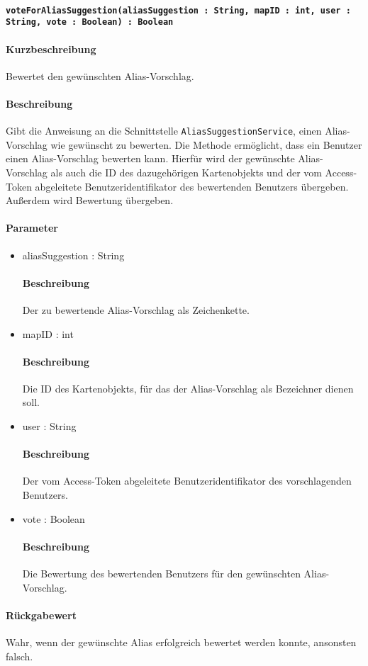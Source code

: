 \paragraph*{\texttt{voteForAliasSuggestion(aliasSuggestion : String, mapID : int, user : String, vote : Boolean) : Boolean}}%
\paragraph*{Kurzbeschreibung}
Bewertet den gewünschten Alias-Vorschlag.
\paragraph*{Beschreibung}
Gibt die Anweisung an die Schnittstelle \texttt{AliasSuggestionService}, einen Alias-Vorschlag wie gewünscht zu bewerten.
Die Methode ermöglicht, dass ein Benutzer einen Alias-Vorschlag bewerten kann. 
Hierfür wird der gewünschte Alias-Vorschlag als auch die ID des dazugehörigen Kartenobjekts und der vom Access-Token abgeleitete Benutzeridentifikator des bewertenden Benutzers übergeben.
Außerdem wird Bewertung übergeben.
\paragraph*{Parameter}
\begin{itemize}
	\item aliasSuggestion : String
		\paragraph*{Beschreibung}
		Der zu bewertende Alias-Vorschlag als Zeichenkette.
	\item mapID : int
		\paragraph*{Beschreibung}
		Die ID des Kartenobjekts, für das der Alias-Vorschlag als Bezeichner dienen soll.
	\item user : String
		\paragraph*{Beschreibung}
		Der vom Access-Token abgeleitete Benutzeridentifikator des vorschlagenden Benutzers.
	\item vote : Boolean
		\paragraph*{Beschreibung}
		Die Bewertung des bewertenden Benutzers für den gewünschten Alias-Vorschlag.
\end{itemize}
\paragraph*{Rückgabewert}
Wahr, wenn der gewünschte Alias erfolgreich bewertet werden konnte, ansonsten falsch.
